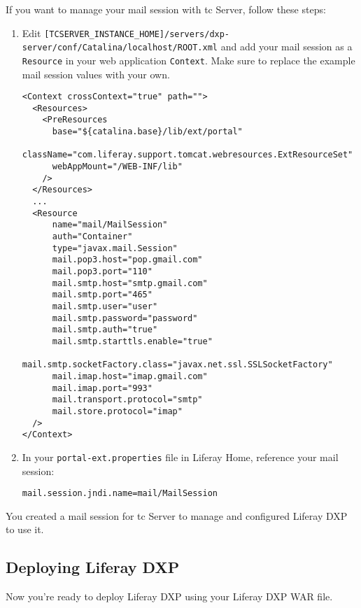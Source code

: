 If you want to manage your mail session with tc Server, follow these
steps:

\begin{enumerate}
\def\labelenumi{\arabic{enumi}.}
\item
  Edit
  \texttt{{[}TCSERVER\_INSTANCE\_HOME{]}/servers/dxp-server/conf/Catalina/localhost/ROOT.xml}
  and add your mail session as a \texttt{Resource} in your web
  application \texttt{Context}. Make sure to replace the example mail
  session values with your own.

\begin{verbatim}
<Context crossContext="true" path="">
  <Resources>
    <PreResources
      base="${catalina.base}/lib/ext/portal"
      className="com.liferay.support.tomcat.webresources.ExtResourceSet"
      webAppMount="/WEB-INF/lib"
    />
  </Resources>
  ...
  <Resource
      name="mail/MailSession"
      auth="Container"
      type="javax.mail.Session"
      mail.pop3.host="pop.gmail.com"
      mail.pop3.port="110"
      mail.smtp.host="smtp.gmail.com"
      mail.smtp.port="465"
      mail.smtp.user="user"
      mail.smtp.password="password"
      mail.smtp.auth="true"
      mail.smtp.starttls.enable="true"
      mail.smtp.socketFactory.class="javax.net.ssl.SSLSocketFactory"
      mail.imap.host="imap.gmail.com"
      mail.imap.port="993"
      mail.transport.protocol="smtp"
      mail.store.protocol="imap"
  />
</Context>
\end{verbatim}
\item
  In your \texttt{portal-ext.properties} file in Liferay Home, reference
  your mail session:

\begin{verbatim}
mail.session.jndi.name=mail/MailSession
\end{verbatim}
\end{enumerate}

You created a mail session for tc Server to manage and configured
Liferay DXP to use it.

\subsection{Deploying Liferay DXP}\label{deploying-liferay-dxp-3}

Now you're ready to deploy Liferay DXP using your Liferay DXP WAR file.

